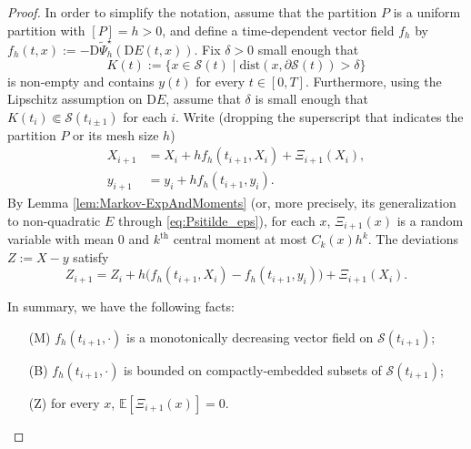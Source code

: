 \documentclass[reqno]{amsart}
\theoremstyle{definition}
\begin{document}
\begin{proof}
	In order to simplify the notation, assume that the partition $P$ is a uniform partition with $[P] = h > 0$, and define a time-dependent vector field $f_{h}$ by $f_{h} (t, x) := -{\mathrm{D}} {\widetilde{\Psi}}_{h}^{\star} ({\mathrm{D}} E(t, x))$.  Fix $\delta > 0$ small enough that
	\[
		K(t) := \{ x \in {\mathcal{S}}(t) \mid \mathrm{dist}(x, \partial {\mathcal{S}}(t)) > \delta \}
	\]
	is non-empty and contains $y(t)$ for every $t \in [0, T]$.  Furthermore, using the Lipschitz assumption on ${\mathrm{D}} E$, assume that $\delta$ is small enough that $K(t_{i}) \Subset {\mathcal{S}}(t_{i \pm 1})$ for each $i$.  Write (dropping the superscript that indicates the partition $P$ or its mesh size $h$)
	\begin{align*}
		X_{i + 1} &= X_{i} + h f_{h} (t_{i + 1}, X_{i}) + \Xi_{i + 1} (X_{i}), \\
		y_{i + 1} &= y_{i} + h f_{h} (t_{i + 1}, y_{i}).
	\end{align*}
	By Lemma \ref{lem:Markov-ExpAndMoments} (or, more precisely, its generalization to non-quadratic $E$ through \eqref{eq:Psitilde_eps}), for each $x$, $\Xi_{i + 1}(x)$ is a random variable with mean 0 and $k^{\mathrm{th}}$ central moment at most $C_{k}(x) h^{k}$.  The deviations $Z := X - y$ satisfy
	\begin{equation}
		\label{eq:RecurrenceForDeviations} 		Z_{i + 1} = Z_{i} + h \big( f_{h} (t_{i + 1}, X_{i}) - f_{h} (t_{i + 1}, y_{i}) \big) + \Xi_{i + 1} (X_{i}).
	\end{equation}

	In summary, we have the following facts:
	\begin{itemize}
		\item[(M)] $f_{h} (t_{i + 1}, \cdot)$ is a monotonically decreasing vector field on ${\mathcal{S}}(t_{i + 1})$;
		\item[(B)] $f_{h} (t_{i + 1}, \cdot)$ is bounded on compactly-embedded subsets of ${\mathcal{S}}(t_{i + 1})$;
		\item[(Z)] for every $x$, ${\mathbb{E}} [ \Xi_{i + 1}(x) ] = 0$.
	\end{itemize}


\end{proof}
\end{document}
